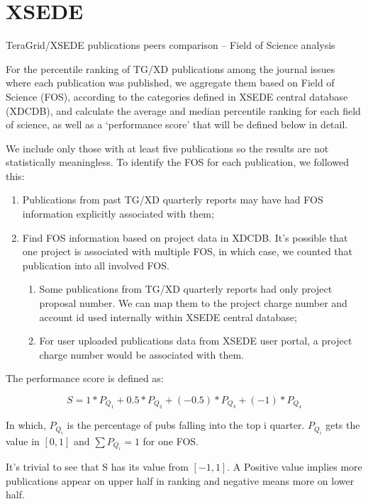 \documentclass{sig-alternate}
\begin{document}
\section{XSEDE}

TeraGrid/XSEDE publications peers comparison – Field of Science analysis


For the percentile ranking of TG/XD publications among the journal issues where each publication was published, we aggregate them based on Field of Science (FOS), according to the categories defined in XSEDE central database (XDCDB), and calculate the average and median percentile ranking for each field of science, as well as a ‘performance score’ that will be defined below in detail.

We include only those with at least five publications so the results
are not statistically meaningless. To identify the FOS for each
publication, we followed this:

\begin{enumerate}

\item	Publications from past TG/XD quarterly reports may have had FOS information explicitly associated with them;
\item	Find FOS information based on project data in XDCDB. It’s
  possible that one project is associated with multiple FOS, in which
  case, we counted that publication into all involved FOS.
\begin{enumerate}
\item	Some publications from TG/XD quarterly reports had only project proposal number. We can map them to the project charge number and account id used internally within XSEDE central database;
\item	For user uploaded publications data from XSEDE user portal, a project charge number would be associated with them.
\end{enumerate}
\end{enumerate}

The performance score is defined as:

\[	S = 1*P_{Q_1} + 0.5*P_{Q_2}+ (-0.5)*P_{Q_3} + (-1)*P_{Q_4} \]

In which, $P_{Q_i}$ is the percentage of pubs falling into the top i
quarter. $P_{Q_i}$ gets the value in $[0,1]$ and $\sum {P_{Q_i}} = 1$ for one FOS.

It’s trivial to see that S has its value from $[-1, 1]$. A Positive value implies more publications appear on upper half in ranking and negative means more on lower half.
\end{document}
